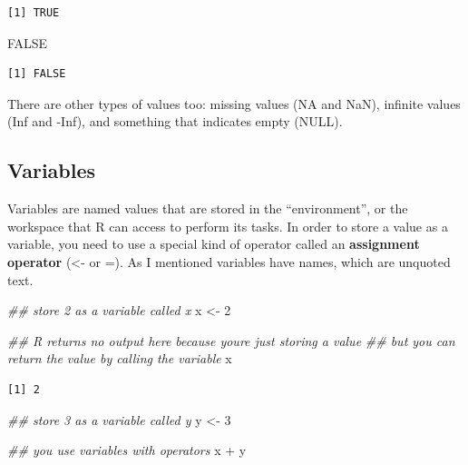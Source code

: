 \documentclass[
  letterpaper,
  DIV=11,
  numbers=noendperiod]{scrreprt}
\newenvironment{Shaded}{\begin{snugshade}}{\end{snugshade}}
\newcommand{\ConstantTok}[1]{\textcolor[rgb]{0.56,0.35,0.01}{#1}}
\newcommand{\DecValTok}[1]{\textcolor[rgb]{0.68,0.00,0.00}{#1}}
\newcommand{\DocumentationTok}[1]{\textcolor[rgb]{0.37,0.37,0.37}{\textit{#1}}}
\newcommand{\NormalTok}[1]{\textcolor[rgb]{0.00,0.23,0.31}{#1}}
\newcommand{\OtherTok}[1]{\textcolor[rgb]{0.00,0.23,0.31}{#1}}
\newcommand{\SpecialCharTok}[1]{\textcolor[rgb]{0.37,0.37,0.37}{#1}}
\begin{document}
\begin{verbatim}
[1] TRUE
\end{verbatim}

\begin{Shaded}
\begin{Highlighting}[]
\ConstantTok{FALSE}
\end{Highlighting}
\end{Shaded}

\begin{verbatim}
[1] FALSE
\end{verbatim}

There are other types of values too: missing values (NA and NaN),
infinite values (Inf and -Inf), and something that indicates empty
(NULL).

\hypertarget{variables}{%
\subsection{Variables}\label{variables}}

Variables are named values that are stored in the ``environment'', or
the workspace that R can access to perform its tasks. In order to store
a value as a variable, you need to use a special kind of operator called
an \textbf{assignment operator} (\textless- or =). As I mentioned
variables have names, which are unquoted text.

\begin{Shaded}
\begin{Highlighting}[]
\DocumentationTok{\#\# store 2 as a variable called x}
\NormalTok{x }\OtherTok{\textless{}{-}} \DecValTok{2}

\DocumentationTok{\#\# R returns no output here because you\textquotesingle{}re just storing a value}
\DocumentationTok{\#\# but you can return the value by calling the variable}
\NormalTok{x}
\end{Highlighting}
\end{Shaded}

\begin{verbatim}
[1] 2
\end{verbatim}

\begin{Shaded}
\begin{Highlighting}[]
\DocumentationTok{\#\# store 3 as a variable called y}
\NormalTok{y }\OtherTok{\textless{}{-}} \DecValTok{3}

\DocumentationTok{\#\# you use variables with operators}
\NormalTok{x }\SpecialCharTok{+}\NormalTok{ y}
\end{Highlighting}
\end{Shaded}
\end{document}
